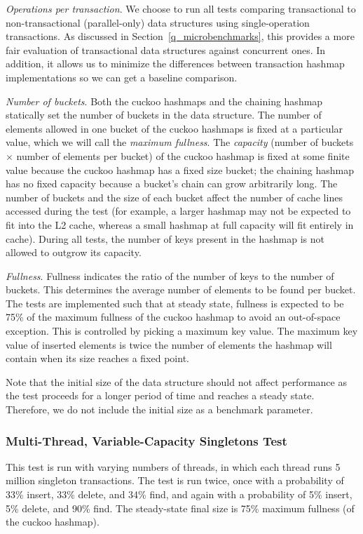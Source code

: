 \emph{Operations per transaction}. We choose to run all tests comparing transactional to non-transactional (parallel-only) data structures using single-operation transactions. As discussed in Section~\ref{q_microbenchmarks}, this provides a more fair evaluation of transactional data structures against concurrent ones. In addition, it allows us to minimize the differences between transaction hashmap implementations so we can get a baseline comparison.

\emph{Number of buckets}. Both the cuckoo hashmaps and the chaining hashmap statically set the number of buckets in the data structure. The number of elements allowed in one bucket of the cuckoo hashmaps is fixed at a particular value, which we will call the \emph{maximum fullness}. 
        The \emph{capacity} (number of buckets $\times$ number of elements per bucket) of the cuckoo hashmap is fixed at some finite value because the cuckoo hashmap has a fixed size bucket; the chaining hashmap has no fixed capacity because a bucket's chain can grow arbitrarily long.
        The number of buckets and the size of each bucket affect the number of cache lines accessed during the test (for example, a larger hashmap may not be expected to fit into the L2 cache, whereas a small hashmap at full capacity will fit entirely in cache). During all tests, the number of keys present in the hashmap is not allowed to outgrow its capacity.
    
    \emph{Fullness}. Fullness indicates the ratio of the number of keys to the number of buckets. This determines the average number of elements to be found per bucket. The tests are implemented such that at steady state, fullness is expected to be 75\% of the maximum fullness of the cuckoo hashmap to avoid an out-of-space exception. This is controlled by picking a maximum key value. The maximum key value of inserted elements is twice the number of elements the hashmap will contain when its size reaches a fixed point.

        Note that the initial size of the data structure should not affect performance as the test proceeds for a longer period of time and reaches a steady state. Therefore, we do not include the initial size as a benchmark parameter.

\subsubsection{Multi-Thread, Variable-Capacity Singletons Test} 
This test is run with varying numbers of threads, in which each thread runs 5 million singleton transactions.
The test is run twice, once with a probability of 33\% insert, 33\% delete, and 34\% find, and again with a probability of 5\% insert, 5\% delete, and 90\% find. The steady-state final size is 75\% maximum fullness (of the cuckoo hashmap).

